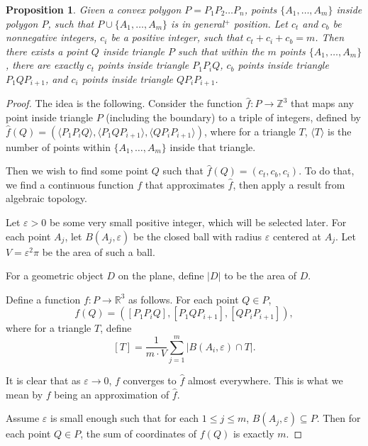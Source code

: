 \documentclass{article}
\theoremstyle{plain}
\newtheorem{proposition}         {Proposition}      [section]
\newcommand\ZZ{\mathbb{Z}}
\newcommand\RR{\mathbb{R}}
\begin{document}
\begin{proposition}
	\label{prop_triangle_subdivision_3}
	Given a convex polygon $P = P_1 P_2 \dots P_n$,
	points $\{A_1, \dots, A_m \}$ inside polygon $P$,
	such that $P \cup \{ A_1, \dots, A_m \}$ is in general$^+$ position.
	Let $c_t$ and $c_b$ be nonnegative integers, $c_i$ be a positive integer,
	such that $c_t + c_i + c_b = m$.
	Then there exists a point $Q$ inside triangle $P$ such that within the $m$ points
	$\{ A_1, \dots, A_m \}$,
	there are exactly $c_t$ points inside triangle $P_1 P_i Q$,
	$c_b$ points inside triangle $P_1 Q P_{i+1}$,
	and $c_i$ points inside triangle $Q P_i P_{i+1}$.
\end{proposition}
\begin{proof}
	\newcommand\bracket[1]{\langle #1 \rangle}
	The idea is the following.
	Consider the function $\hat f \colon P \to \ZZ^3$ that maps any point inside triangle $P$ (including the boundary)
	to a triple of integers, defined by $\hat f(Q) = (\bracket{P_1 P_i Q}, \bracket{P_1 Q P_{i+1}}, \bracket{Q P_i P_{i+1}})$,
	where for a triangle $T$, $\bracket{T}$ is the number of points within $\{ A_1, \dots, A_m \}$ inside that triangle.

	Then we wish to find some point $Q$ such that $\hat f(Q) =(c_t, c_b, c_i)$.
	To do that, we find a continuous function $f$ that approximates $\hat f$,
	then apply a result from algebraic topology.

	\renewcommand\bracket[1]{[#1]}

	Let $\varepsilon>0$ be some very small positive integer, which will be selected later.
	For each point $A_j$, let $B(A_j, \varepsilon)$ be the closed ball with radius $\varepsilon$ centered at $A_j$.
	Let $V = \varepsilon^2 \pi$ be the area of such a ball.

	For a geometric object $D$ on the plane, define $|D|$ to be the area of $D$.

	Define a function $f \colon P \to \RR^3$ as follows.
	For each point $Q \in P$,
	\[ f(Q) = (\bracket{P_1 P_i Q}, \bracket{P_1 Q P_{i+1}}, \bracket{Q P_i P_{i+1}}), \]
	where for a triangle $T$, define \[ \bracket{T} = \frac{1}{m \cdot V} \sum_{j=1}^m |B(A_i, \varepsilon) \cap T|. \]

	It is clear that as $\varepsilon \to 0$, $f$ converges to $\hat f$ almost everywhere.
	This is what we mean by $f$ being an approximation of $\hat f$.

	Assume $\varepsilon$ is small enough such that for each $1 \leq j \leq m$,
	$B(A_j, \varepsilon) \subseteq P$.
	Then for each point $Q \in P$, the sum of coordinates of $f(Q)$ is exactly $m$.


\end{proof}
\end{document}
